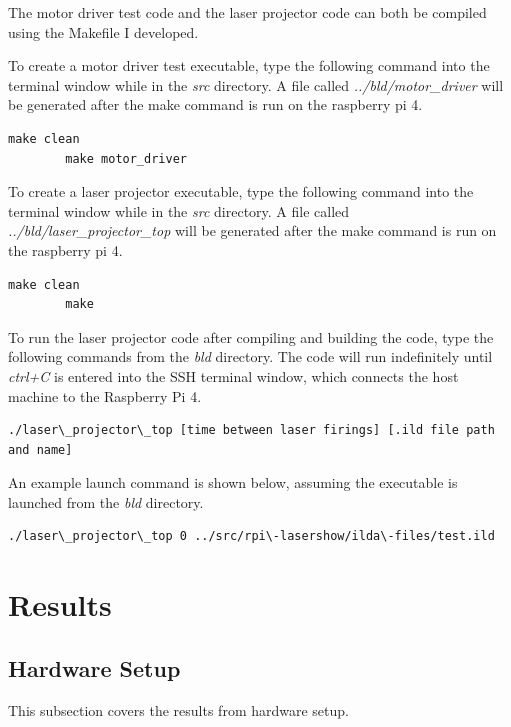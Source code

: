 \documentclass[journal]{IEEEtran}
\begin{document}
    The motor driver test code and the laser projector code can both be compiled using the Makefile I developed.

    To create a motor driver test executable, type the following command into the terminal window while in the \emph{src} directory.
    A file called \emph{../bld/motor\_driver} will be generated after the make command is run on the raspberry pi 4.

    \begin{lstlisting}[frame=single, basicstyle=\ttfamily\footnotesize, breaklines=true]
        make clean
        make motor_driver
    \end{lstlisting}

    To create a laser projector executable, type the following command into the terminal window while in the \emph{src} directory.
    A file called \emph{../bld/laser\_projector\_top} will be generated after the make command is run on the raspberry pi 4.

    \begin{lstlisting}[frame=single, basicstyle=\ttfamily\footnotesize, breaklines=true]
        make clean
        make
    \end{lstlisting}

    To run the laser projector code after compiling and building the code, type the following commands from the \emph{bld} directory.
    The code will run indefinitely until \emph{ctrl+C} is entered into the SSH terminal window, which connects the host machine to the Raspberry Pi 4. 

    \begin{lstlisting}[frame=single, basicstyle=\ttfamily\footnotesize, breaklines=true]
        ./laser\_projector\_top [time between laser firings] [.ild file path and name]
    \end{lstlisting}

    An example launch command is shown below, assuming the executable is launched from the \emph{bld} directory.

    \begin{lstlisting}[frame=single, basicstyle=\ttfamily\footnotesize, breaklines=true]
        ./laser\_projector\_top 0 ../src/rpi\-lasershow/ilda\-files/test.ild
    \end{lstlisting}

    \section{Results}
    \subsection{Hardware Setup}
    This subsection covers the results from hardware setup.
\end{document}
